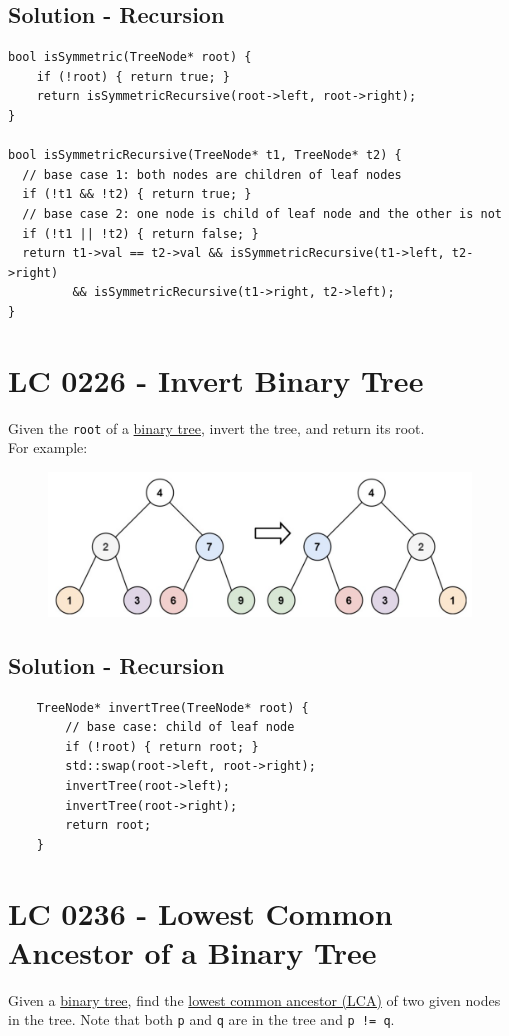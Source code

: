\subsection*{Solution - Recursion}
\begin{lstlisting}
bool isSymmetric(TreeNode* root) {
	if (!root) { return true; }
	return isSymmetricRecursive(root->left, root->right);
}

bool isSymmetricRecursive(TreeNode* t1, TreeNode* t2) {
  // base case 1: both nodes are children of leaf nodes
  if (!t1 && !t2) { return true; }
  // base case 2: one node is child of leaf node and the other is not
  if (!t1 || !t2) { return false; }
  return t1->val == t2->val && isSymmetricRecursive(t1->left, t2->right)
         && isSymmetricRecursive(t1->right, t2->left);
}
\end{lstlisting}

\section{LC 0226 - Invert Binary Tree}
Given the {\colorbox{CodeBackground}{\lstinline|root|}} of a \ul{binary tree}, invert the tree, and return its root.\\

For example:
\begin{figure}[H]
	\centering
	\includegraphics[width=0.7\linewidth]{images/lc0226_example}
	\label{fig:lc0226example}
\end{figure}

\subsection*{Solution - Recursion}
\begin{lstlisting}
	TreeNode* invertTree(TreeNode* root) {
		// base case: child of leaf node
		if (!root) { return root; }
		std::swap(root->left, root->right);
		invertTree(root->left);
		invertTree(root->right);
		return root;
	}
\end{lstlisting}

\section{LC 0236 - Lowest Common Ancestor of a Binary Tree}\label{lc0236}
Given a \ul{binary tree}, find the \ul{lowest common ancestor (LCA)} of two given nodes in the tree. Note that both {\colorbox{CodeBackground}{\lstinline|p|}} and {\colorbox{CodeBackground}{\lstinline|q|}} are in the tree and {\colorbox{CodeBackground}{\lstinline|p != q|}}.\\

